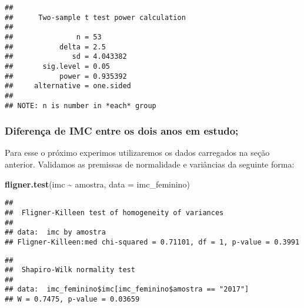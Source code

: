\documentclass[
]{article}
\newenvironment{Shaded}{\begin{snugshade}}{\end{snugshade}}
\newcommand{\AttributeTok}[1]{\textcolor[rgb]{0.13,0.29,0.53}{#1}}
\newcommand{\FunctionTok}[1]{\textcolor[rgb]{0.13,0.29,0.53}{\textbf{#1}}}
\newcommand{\NormalTok}[1]{#1}
\newcommand{\SpecialCharTok}[1]{\textcolor[rgb]{0.81,0.36,0.00}{\textbf{#1}}}
\newcommand{\StringTok}[1]{\textcolor[rgb]{0.31,0.60,0.02}{#1}}
\begin{document}
\begin{verbatim}
## 
##      Two-sample t test power calculation 
## 
##               n = 53
##           delta = 2.5
##              sd = 4.043382
##       sig.level = 0.05
##           power = 0.935392
##     alternative = one.sided
## 
## NOTE: n is number in *each* group
\end{verbatim}

\subsubsection{Diferença de IMC entre os dois anos em
estudo;}\label{diferenuxe7a-de-imc-entre-os-dois-anos-em-estudo-1}

Para esse o próximo experimos utilizaremos os dados carregados na seção
anterior. Validamos as premissas de normalidade e variâncias da seguinte
forma:

\begin{Shaded}
\begin{Highlighting}[]
\FunctionTok{fligner.test}\NormalTok{(imc }\SpecialCharTok{\textasciitilde{}}\NormalTok{ amostra, }\AttributeTok{data =}\NormalTok{ imc\_feminino) }
\end{Highlighting}
\end{Shaded}

\begin{verbatim}
## 
##  Fligner-Killeen test of homogeneity of variances
## 
## data:  imc by amostra
## Fligner-Killeen:med chi-squared = 0.71101, df = 1, p-value = 0.3991
\end{verbatim}

\begin{Shaded}
\end{Shaded}

\begin{verbatim}
## 
##  Shapiro-Wilk normality test
## 
## data:  imc_feminino$imc[imc_feminino$amostra == "2017"]
## W = 0.7475, p-value = 0.03659
\end{verbatim}

\begin{Shaded}
\end{Shaded}
\end{document}
